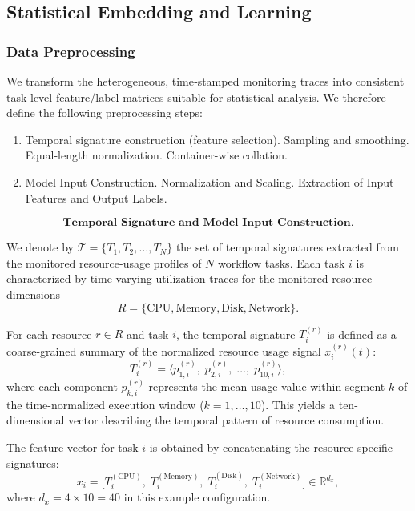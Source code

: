 \subsection{Statistical Embedding and Learning}
\label{sec:statistical_embedding_and_learning}
\subsubsection{Data Preprocessing}
\label{sec:data_preprocessing}
We transform the heterogeneous, time‐stamped monitoring traces into consistent task-level feature/label matrices suitable for statistical analysis. We therefore define the following preprocessing steps:

\begin{enumerate}
    \item Temporal signature construction (feature selection).
          \subitem Sampling and smoothing.
          \subitem Equal-length normalization.
          \subitem Container-wise collation.
    \item Model Input Construction.
          \subitem Normalization and Scaling.
          \subitem Extraction of Input Features and Output Labels.
\end{enumerate}


\[
    \textbf{Temporal Signature and Model Input Construction.}
\]

We denote by \( \mathcal{T} = \{ T_1, T_2, \dots, T_N \} \) the set of
temporal signatures extracted from the monitored resource-usage profiles
of \( N \) workflow tasks.
Each task \( i \) is characterized by time-varying utilization traces
for the monitored resource dimensions
\[
    R = \{ \text{CPU}, \text{Memory}, \text{Disk}, \text{Network} \}.
\]

\noindent
For each resource \( r \in R \) and task \( i \),
the temporal signature \( T_i^{(r)} \) is defined as a
coarse-grained summary of the normalized resource usage signal
\( x_i^{(r)}(t) \):
\[
    T_i^{(r)} =
    \bigl\langle
    p_{1,i}^{(r)},\;
    p_{2,i}^{(r)},\;
    \dots,\;
    p_{10,i}^{(r)}
    \bigr\rangle,
    \tag{1}
\]
where each component \( p_{k,i}^{(r)} \) represents the mean
usage value within segment \( k \) of the time-normalized
execution window (\( k = 1, \dots, 10 \)).
This yields a ten-dimensional vector describing the temporal pattern of
resource consumption.

\noindent
The feature vector for task \( i \) is obtained by concatenating
the resource-specific signatures:
\[
    x_i =
    \bigl[
    T_i^{(\text{CPU})},\;
    T_i^{(\text{Memory})},\;
    T_i^{(\text{Disk})},\;
    T_i^{(\text{Network})}
    \bigr]
    \in \mathbb{R}^{d_x},
\]
where \( d_x = 4 \times 10 = 40 \) in this example configuration.

